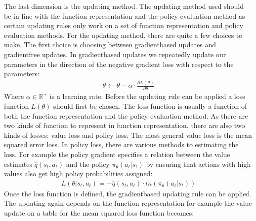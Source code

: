 \documentclass[letterpaper,10pt,english]{jupyterBook}
\begin{document}
\sphinxAtStartPar
The last dimension is the updating method. The updating method used should be in line with the function representation and the policy evaluation method as certain updating rules only work on a set of function representation and policy evaluation methods. For the updating method, there are quite a few choices to make. The first choice is choosing between gradient\sphinxhyphen{}based updates and gradient\sphinxhyphen{}free updates. In gradient\sphinxhyphen{}based updates we repeatedly update our parameters in the direction of the negative gradient loss with respect to the parameters:
\begin{equation*}
\begin{split} \theta \leftarrow \theta - \alpha \cdot \frac{\partial L(\theta)}{\partial \theta} \end{split}
\end{equation*}
\sphinxAtStartPar
Where \(\alpha \in \mathbb{R}^+\) is a learning rate. Before the updating rule can be applied a loss function \(L(\theta)\) should first be chosen. The loss function is usually a function of both the function representation and the policy evaluation method. As there are two kinds of function to represent in function representation, there are also two kinds of losses: value loss and policy loss. The most general value loss is the mean squared error loss. In policy loss, there are various methods to estimating the loss. For example the policy gradient specifies a relation between the value estimates \(\hat{q}(s_t,a_t)\) and the policy \(\pi_{\theta}(a_t|s_t)\) by ensuring that actions with high values also get high policy probabilities assigned:
\begin{equation*}
\begin{split}L(\theta|s_t, a_t) = -\hat{q}(s_t,a_t) \cdot ln (\pi_{\theta}(a_t|s_t))\end{split}
\end{equation*}
\sphinxAtStartPar
Once the loss function is defined, the gradient\sphinxhyphen{}based updating rule can be applied. The updating again depends on the function representation for example the value update on a table for the mean squared loss function becomes:
\end{document}
